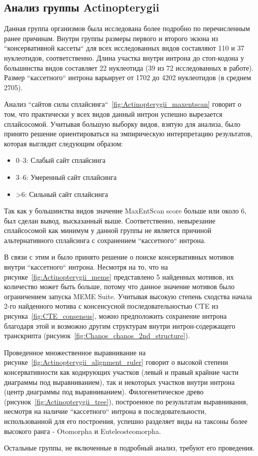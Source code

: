 \subsection{Анализ группы Actinopterygii}

Данная группа организмов была исследована более подробно по перечисленным ранее причинам.
Внутри группы размеры первого и второго экзона из ``консервативной кассеты`` для всех исследованных видов составляют 110 и 37 нуклеотидов, соответственно.
Длина участка внутри интрона до стоп-кодона у большинства видов составляет 22 нуклеотида (39 из 72 исследованных в работе).
Размер ``кассетного`` интрона варьирует от 1702 до 4202 нуклеотидов (в среднем 2705).

Анализ ``сайтов силы сплайсинга``~\ref{fig:Actinopterygii_maxentscan} говорит о том, что практически у всех видов данный интрон успешно вырезается сплайсосомой.
Учитывая большую выборку видов, взятую для анализа, было принято решение ориентироваться на эмпирическую интерпретацию результатов, которая выглядит следующим образом:

\begin{itemize}
    \item 0–3: Слабый сайт сплайсинга
    \item 3–6: Умеренный сайт сплайсинга
    \item >6: Сильный сайт сплайсинга
\end{itemize}

Так как у большинства видов значение MaxEntScan score больше или около 6, был сделан вывод, высказанный выше.
Соответственно, невырезание сплайсосомой как минимум у данной группы не является причиной альтернативного сплайсинга с сохранением ``кассетного`` интрона.

В связи с этим и было принято решение о поиске консервативных мотивов внутри ``кассетного`` интрона.
Несмотря на то, что на рисунке~\ref{fig:Actinopterygii_meme} представлено 5 найденных мотивов, их количество может быть больше, потому что данное значение мотивов было ограничением запуска MEME Suite.
Учитывая высокую степень сходства начала 2-го найденного мотива с консенсусной последовательностью CTE из рисунка~\ref{fig:CTE_consensus}, можно предположить сохранение интрона благодаря этой и возможно другим структурам внутри интрон-содержащего транскрипта (рисунок~\ref{fig:Chanos_chanos_2nd_structure}).

Проведенное множественное выравнивание на рисунке~\ref{fig:Actinopterygii_alignment_ruler} говорит о высокой степени консервативности как кодирующих участков (левый и правый крайние части диаграммы под выравниванием), так и некоторых участков внутри интрона (центр диаграммы под выравниванием).
Филогенетическое древо (рисунок~\ref{fig:Actinopterygii_tree}), построенное по результатам выравнивания, несмотря на наличие ``кассетного`` интрона в последовательности, использованной для его построения, успешно разделяет виды на таксоны более высокого ранга - Otomorpha и Euteleosteomorpha.

Остальные группы, не включенные в подробный анализ, требуют его проведения.